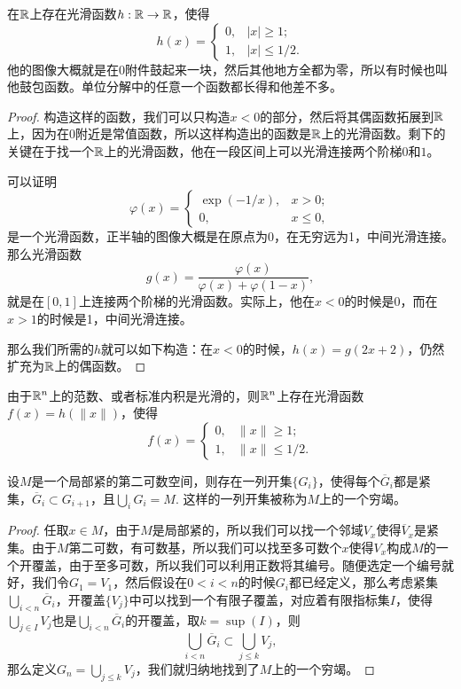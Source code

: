 \begin{pro}[$\rr$上的截断函数]
在$\rr$上存在光滑函数$h:\mathbb{R}\to\mathbb{R}$，使得
\[
	h(x)=
		\begin{cases}
		0,&|x|\geq 1;\\
		1,&|x|\leq 1/2.
		\end{cases}
\]
他的图像大概就是在$0$附件鼓起来一块，然后其他地方全都为零，所以有时候也叫他鼓包函数。单位分解中的任意一个函数都长得和他差不多。
\end{pro}

\begin{proof}
构造这样的函数，我们可以只构造$x<0$的部分，然后将其偶函数拓展到$\rr$上，因为在$0$附近是常值函数，所以这样构造出的函数是$\rr$上的光滑函数。剩下的关键在于找一个$\rr$上的光滑函数，他在一段区间上可以光滑连接两个阶梯$0$和$1$。

可以证明
\[
	\varphi(x)=
		\begin{cases}
			\exp(-1/x),&x> 0;\\
			0,&x\leq 0,
		\end{cases}
\]
是一个光滑函数，正半轴的图像大概是在原点为0，在无穷远为1，中间光滑连接。那么光滑函数
\[
	g(x)=\frac{\varphi(x)}{\varphi(x)+\varphi(1-x)},
\]
就是在$[0,1]$上连接两个阶梯的光滑函数。实际上，他在$x<0$的时候是0，而在$x>1$的时候是1，中间光滑连接。

那么我们所需的$h$就可以如下构造：在$x<0$的时候，$h(x)=g(2x+2)$，仍然扩充为$\rr$上的偶函数。
\end{proof}

\begin{para}[$\rr^n$上的截断函数]
由于$\rr^n$上的范数、或者标准内积是光滑的，则$\rr^n$上存在光滑函数$f(x)=h(\|x\|)$，使得
\[
	f(x)=
		\begin{cases}
		0,&\|x\|\geq 1;\\
		1,&\|x\|\leq 1/2.
		\end{cases}
\]
\end{para}

\begin{lem}
设$M$是一个局部紧的第二可数空间，则存在一列开集$\{G_i\}$，使得每个$\overline{G}_i$都是紧集，$\overline{G}_i\subset G_{i+1}$，且$\bigcup_iG_i=M$. 这样的一列开集被称为$M$上的一个穷竭。
\end{lem}

\begin{proof}
任取$x\in M$，由于$M$是局部紧的，所以我们可以找一个邻域$V_x$使得$\overline{V}_x$是紧集。由于$M$第二可数，有可数基，所以我们可以找至多可数个$x$使得$V_x$构成$M$的一个开覆盖，由于至多可数，所以我们可以利用正数将其编号。随便选定一个编号就好，我们令$G_1=V_1$，然后假设在$0<i<n$的时候$G_i$都已经定义，那么考虑紧集$\bigcup_{i<n}\overline{G}_i$，开覆盖$\{V_j\}$中可以找到一个有限子覆盖，对应着有限指标集$I$，使得$\bigcup_{j\in I}V_j$也是$\bigcup_{i<n}\overline{G}_i$的开覆盖，取$k=\sup(I)$，则
\[
	\bigcup_{i<n}\overline{G}_i\subset \bigcup_{j\leq k}V_j,
\]
那么定义$G_n=\bigcup_{j\leq k}V_j$，我们就归纳地找到了$M$上的一个穷竭。
\end{proof}

